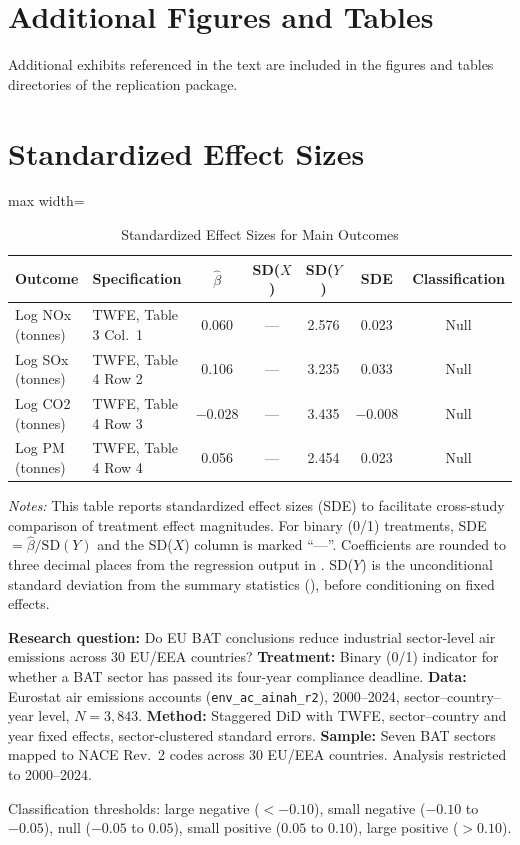 \documentclass[12pt]{article}
\begin{document}
\section{Additional Figures and Tables}
\label{sec:additional}

Additional exhibits referenced in the text are included in the figures and tables directories of the replication package.


\section{Standardized Effect Sizes}
\label{sec:sde}

\begin{table}[H]
\centering
\caption{Standardized Effect Sizes for Main Outcomes}
\label{tab:sde}
\begin{adjustbox}{max width=\textwidth}
\begin{tabular}{llccccc}
\toprule
Outcome & Specification & $\hat{\beta}$ & SD($X$) & SD($Y$) & SDE & Classification \\
\midrule
Log NOx (tonnes) & TWFE, Table 3 Col.\ 1 & 0.060 & --- & 2.576 & 0.023 & Null \\
Log SOx (tonnes) & TWFE, Table 4 Row 2 & 0.106 & --- & 3.235 & 0.033 & Null \\
Log CO2 (tonnes) & TWFE, Table 4 Row 3 & $-0.028$ & --- & 3.435 & $-0.008$ & Null \\
Log PM (tonnes) & TWFE, Table 4 Row 4 & 0.056 & --- & 2.454 & 0.023 & Null \\
\bottomrule
\end{tabular}
\end{adjustbox}
\par\vspace{0.3em}
{\footnotesize \emph{Notes:} This table reports standardized effect sizes (SDE)
to facilitate cross-study comparison of treatment effect magnitudes.
For binary (0/1) treatments, SDE $= \hat{\beta} / \text{SD}(Y)$ and the SD($X$)
column is marked ``---''.
Coefficients are rounded to three decimal places from the regression output in .
SD($Y$) is the unconditional standard deviation from the summary
statistics (), before conditioning on fixed effects.

\textbf{Research question:} Do EU BAT conclusions reduce industrial sector-level air emissions across 30 EU/EEA countries?
\textbf{Treatment:} Binary (0/1) indicator for whether a BAT sector has passed its four-year compliance deadline.
\textbf{Data:} Eurostat air emissions accounts (\texttt{env\_ac\_ainah\_r2}), 2000--2024, sector--country--year level, $N = 3{,}843$.
\textbf{Method:} Staggered DiD with TWFE, sector--country and year fixed effects, sector-clustered standard errors.
\textbf{Sample:} Seven BAT sectors mapped to NACE Rev.~2 codes across 30 EU/EEA countries. Analysis restricted to 2000--2024.

Classification thresholds:
large negative ($< -0.10$), small negative ($-0.10$ to $-0.05$),
null ($-0.05$ to $0.05$), small positive ($0.05$ to $0.10$),
large positive ($> 0.10$).}
\end{table}
\end{document}

